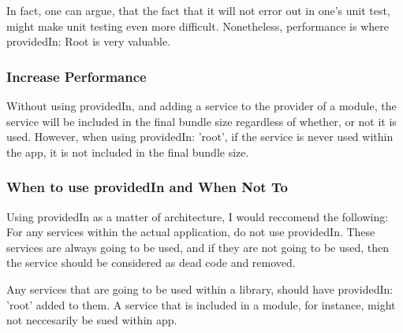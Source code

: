 In fact, one can argue, that the fact that it will not error out in one's unit
test, might make unit testing even more difficult. Nonetheless, performance is
where providedIn: Root is very valuable.

\subsubsection{ Increase Performance }
Without using providedIn, and adding a service to the provider of a module, the
service will be included in the final bundle size regardless of whether, or not
it is used. However, when using providedIn: 'root', if the service is never
used within the app, it is not included in the final bundle size.

\subsubsection{When to use providedIn and When Not To}
Using providedIn as a matter of architecture, I would reccomend the following:
For any services within the actual application, do not use providedIn. These
services are always going to be used, and if they are not going to be used,
then the service should be considered as dead code and removed.

Any services that are going to be used within a library, should have
providedIn: 'root' added to them. A service that is included in a module, for
instance, might not neccesarily be sued within app.

